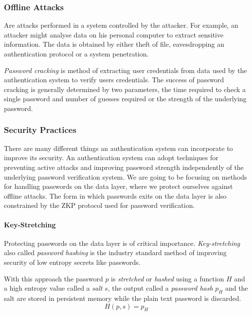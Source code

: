 \subsubsection{Offline Attacks}
Are attacks performed in a system controlled by the attacker.
For example, an attacker might analyse data on his personal computer to extract sensitive information.
The data is obtained by either theft of file, eavesdropping an authentication protocol or a system penetration.

\textit{Password cracking} \cite{blocki2018economics} is method of extracting user credentials from data used by the authentication system to verify users credentials.
The success of password cracking is generally determined by two parameters, the time required to check a single password and number of guesses required or the strength of the underlying password.

\subsubsection{Security Practices}
\label{password-security-practices}
There are many different things an authentication system can incorporate to improve its security.
An authentication system can adopt techniques for preventing active attacks and improving password strength independently of the underlying password verification system.
We are going to be focusing on methods for handling passwords on the data layer, where we protect ourselves against offline attacks.
The form in which passwords exits on the data layer is also constrained by the ZKP protocol used for password verification.

\paragraph{Key-Stretching}
\label{paragraph:password-hashing}
Protecting passwords on the data layer is of critical importance.
\textit{Key-stretching} \cite{hornby2016salted} also called \textit{password hashing} is the industry standard method of improving security of low entropy secrets like passwords.

With this approach the password $p$ is \textit{stretched} or \textit{hashed} using a function $H$ and a high entropy value called a \textit{salt} $s$, the output called a \textit{password hash} $p_H$ and the salt are stored in persistent memory while the plain text password is discarded.
$$H(p, s) = p_H$$

